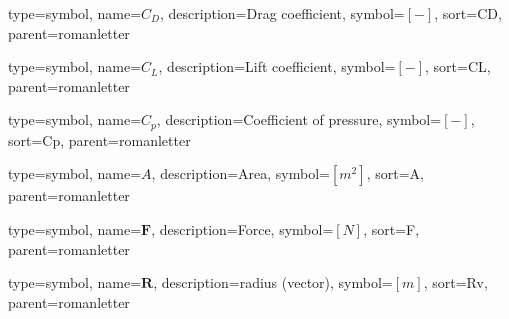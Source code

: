 {
type=symbol, %
name={\ensuremath{C_D}}, %
description={Drag coefficient}, %
symbol={$\left[-\right]$}, %
sort=CD, %
parent=romanletter %
}

{
type=symbol, %
name={\ensuremath{C_L}}, %
description={Lift coefficient}, %
symbol={$\left[-\right]$}, %
sort=CL, %
parent=romanletter %
}

{
	type=symbol, %
	name={\ensuremath{C_p}}, %
	description={Coefficient of pressure}, %
	symbol={$\left[-\right]$}, %
	sort=Cp, %
	parent=romanletter %
}

{
type=symbol, %
name={\ensuremath{A}}, %
description={Area}, %
symbol={$\left[m^2\right]$}, %
sort=A, %
parent=romanletter %
}

{
type=symbol, %
name={\ensuremath{\mathbf{F}}}, %
description={Force}, %
symbol={$\left[N\right]$}, %
sort=F, %
parent=romanletter %
}

{
type=symbol, %
name={\ensuremath{\mathbf{R}}}, %
description={radius (vector)}, %
symbol={$\left[m\right]$}, %
sort=Rv, %
parent=romanletter %
}

